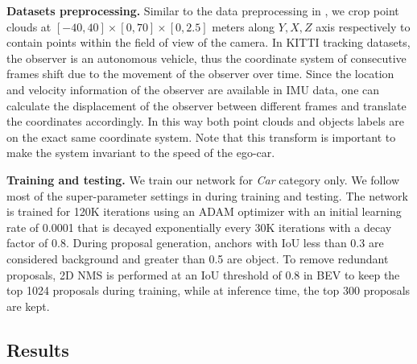 \documentclass{bmvc2k}
\begin{document}
\textbf{Datasets preprocessing.} Similar to the data preprocessing in \cite{ku2018joint}, we crop point clouds at $[-40, 40] \times [0, 70] \times [0, 2.5]$ meters along $Y, X, Z$ axis respectively to contain points within the field of view of the camera. In KITTI tracking datasets, the observer is an autonomous vehicle, thus the coordinate system of consecutive frames shift due to the movement of the observer over time. Since the location and velocity information of the observer are available in IMU data, one can calculate the displacement of the observer between different frames and translate the coordinates accordingly. In this way both point clouds and objects labels are on the exact same coordinate system. Note that this transform is important to make the system invariant to the speed of the ego-car.

\textbf{Training and testing.} We train our network for \textit{Car} category only. We follow most of the super-parameter settings in \cite{ku2018joint} during training and testing. The network is trained for 120K iterations using an ADAM\cite{kingma2014adam} optimizer with an initial learning rate of 0.0001 that is decayed exponentially every 30K iterations with a decay factor of 0.8. During proposal generation, anchors with IoU less than 0.3 are considered background and greater than 0.5 are object. To remove redundant proposals, 2D NMS is performed at an IoU threshold of 0.8 in BEV to keep the top 1024 proposals during training, while at inference time, the top 300 proposals are kept.

\subsection{Results}
\end{document}
